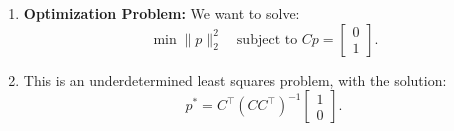 \begin{example}
\begin{enumerate}
        \item \textbf{Optimization Problem:} We want to solve:
        \[
        \min \|p\|_2^2 \quad \text{subject to } Cp = 
        \begin{bmatrix}
        0 \\ 
        1
        \end{bmatrix}.
        \]
        
        \item This is an underdetermined least squares problem, with the solution:
        \[
        p^* = C^\top (C C^\top)^{-1} 
        \begin{bmatrix}
        1 \\ 
        0
        \end{bmatrix}.
        \]
    \end{enumerate}
\end{example}
